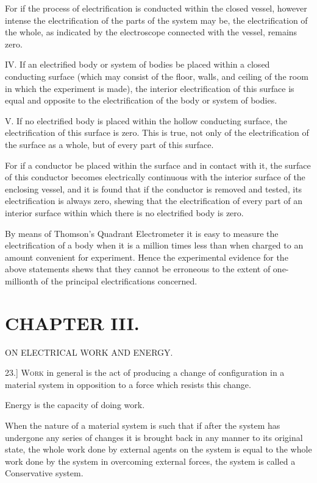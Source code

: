 \documentclass[12pt,oneside]{book}[2021/10/04]
\newcommand{\Heading}{\centering\normalfont}
\newcommand{\Chapter}[1]{\section*{\large\Heading #1}}
\newcommand{\Subheading}[1]{\begin{center}\small #1 \end{center}}
\newcommand{\article}[1]{\phantomsection \label{art:#1}{#1.]}}
\newcommand{\¬}{\hphantom{0}}
\newcommand{\newchapter}{\newpage\thispagestyle{empty}}
\begin{document}
For if the process of electrification is conducted within the
closed vessel, however intense the electrification of the parts of
the system may be, the electrification of the whole, as indicated by
the electroscope connected with the vessel, remains zero.

IV\@. If an electrified body or system of bodies be placed within
a closed conducting surface (which may consist of the floor, walls,
and ceiling of the room in which the experiment is made), the interior
electrification of this surface is equal and opposite to the
electrification of the body or system of bodies.

V\@. If no electrified body is placed within the hollow conducting
surface, the electrification of this surface is zero. This is true, not
only of the electrification of the surface as a whole, but of every
part of this surface.

For if a conductor be placed within the surface and in contact
with it, the surface of this conductor becomes electrically continuous
with the interior surface of the enclosing vessel, and it is found
that if the conductor is removed and tested, its electrification is
always zero, shewing that the electrification of every part of an
interior surface within which there is no electrified body is zero.

By means of Thomson's Quadrant Electrometer it is easy to
measure the electrification of a body when it is a million times less
than when charged to an amount convenient for experiment.
Hence the experimental evidence for the above statements shews
that they cannot be erroneous to the extent of one-millionth of the
principal electrifications concerned.

\newchapter
\Chapter{CHAPTER III.}
\Subheading{ON ELECTRICAL WORK AND ENERGY.}

\article{23} \textsc{Work} in general is the act of producing a change of configuration
in a material system in opposition to a force which
resists this change.

Energy is the capacity of doing work.

When the nature of a material system is such that if after the
system has undergone any series of changes it is brought back
in any manner to its original state, the whole work done by
external agents on the system is equal to the whole work done
by the system in overcoming external forces, the system is called
a Conservative system.
\end{document}
